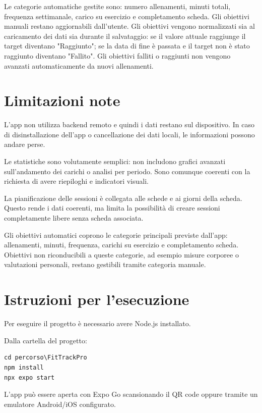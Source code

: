 \documentclass[11pt,a4paper]{article}
\begin{document}
Le categorie automatiche gestite sono: numero allenamenti, minuti totali, frequenza settimanale, carico su esercizio e completamento scheda. Gli obiettivi manuali restano aggiornabili dall'utente. Gli obiettivi vengono normalizzati sia al caricamento dei dati sia durante il salvataggio: se il valore attuale raggiunge il target diventano "Raggiunto"; se la data di fine è passata e il target non è stato raggiunto diventano "Fallito". Gli obiettivi falliti o raggiunti non vengono avanzati automaticamente da nuovi allenamenti.

\section{Limitazioni note}

L'app non utilizza backend remoto e quindi i dati restano sul dispositivo. In caso di disinstallazione dell'app o cancellazione dei dati locali, le informazioni possono andare perse.

Le statistiche sono volutamente semplici: non includono grafici avanzati sull'andamento dei carichi o analisi per periodo. Sono comunque coerenti con la richiesta di avere riepiloghi e indicatori visuali.

La pianificazione delle sessioni è collegata alle schede e ai giorni della scheda. Questo rende i dati coerenti, ma limita la possibilità di creare sessioni completamente libere senza scheda associata.

Gli obiettivi automatici coprono le categorie principali previste dall'app: allenamenti, minuti, frequenza, carichi su esercizio e completamento scheda. Obiettivi non riconducibili a queste categorie, ad esempio misure corporee o valutazioni personali, restano gestibili tramite categoria manuale.

\section{Istruzioni per l'esecuzione}

Per eseguire il progetto è necessario avere Node.js installato.

Dalla cartella del progetto:

\begin{lstlisting}
cd percorso\FitTrackPro
npm install
npx expo start
\end{lstlisting}

L'app può essere aperta con Expo Go scansionando il QR code oppure tramite un emulatore Android/iOS configurato.
\end{document}
